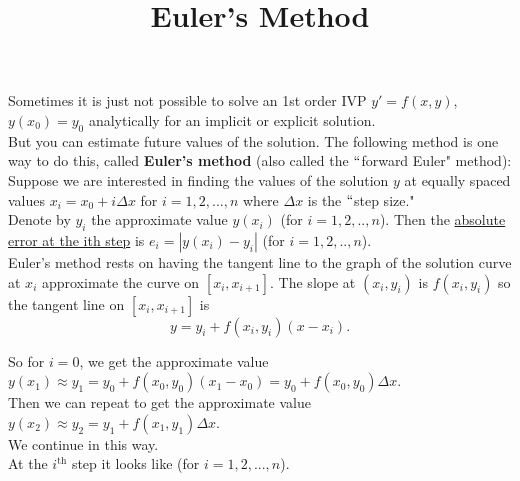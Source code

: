 \documentclass{ximera}
\begin{document}
\begin{abstract}
 \end{abstract}

    \title{Euler's Method}
    \maketitle

 Sometimes it is just not possible to solve an 1st order IVP $y'=f(x,y)$, $y(x_{0})=y_{0}$ analytically for an implicit or explicit solution.\\

 But you can estimate future values of the solution.  The following method is one way to do this,  called \textbf{Euler's method} (also called the $``$forward Euler" method):\\


 Suppose we are interested in finding the values of the solution $y$ at equally spaced values $x_{i}=x_{0}+i\Delta x$ for $i=1,2,...,n$ where $\Delta x$ is the $``$step size." \\

Denote by $y_{i}$ the approximate value $y(x_{i})$ (for $i=1,2,..,n$).  Then the \underline{absolute error at the ith step} is $e_{i}=|y(x_{i})-y_{i}|$ (for $i=1,2,..,n$). \\


 Euler's method rests on having the tangent line to the graph of the solution curve at $x_{i}$ approximate the curve on $[x_{i},x_{i+1}]$.  The slope at $(x_{i},y_{i})$ is $f(x_{i},y_{i})$  so the tangent line on $[x_{i},x_{i+1}]$ is  $$y=y_{i}+f(x_{i},y_{i})(x-x_{i}).$$

\vspace{1cm}

 So for $i=0$, we get the approximate value \\$y(x_1)\approx y_{1}=y_{0}+f(x_{0},y_{0})(x_{1}-x_{0})=y_{0}+ f(x_{0},y_{0})\Delta x$.\\


 Then we can repeat to get the approximate value \\$y(x_2)\approx y_{2}=y_{1}+ f(x_{1},y_{1})\Delta x$.\\


 We continue in this way. \\

 At the $i^{\mbox{th}}$ step it looks like  (for $i=1,2,...,n$).


\newpage
\end{document}
